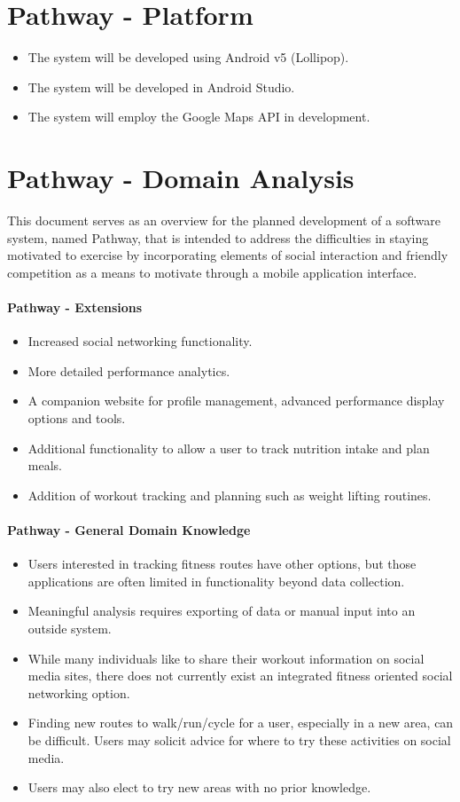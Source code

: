 ﻿\documentclass{article}
\begin{document}
\section{Pathway - Platform}
\begin{itemize}
    \item The system will be developed using Android v5 (Lollipop).
    \item The system will be developed in Android Studio.
    \item The system will employ the Google Maps API in development.
\end{itemize}

\section{Pathway - Domain Analysis}
This document serves as an overview for the planned development of a software system, named Pathway, that is intended to address the difficulties in staying motivated to exercise by incorporating elements of social interaction and friendly competition as a means to motivate through a mobile application interface.

\paragraph{Pathway - Extensions}
\begin{itemize}
    \item Increased social networking functionality.
    \item More detailed performance analytics.
    \item A companion website for profile management, advanced performance display options and tools.
    \item Additional functionality to allow a user to track nutrition intake and plan meals.
    \item Addition of workout tracking and planning such as weight lifting routines.
\end{itemize}

\paragraph{Pathway - General Domain Knowledge}
\begin{itemize}
    \item Users interested in tracking fitness routes have other options, but those applications are often limited in functionality beyond data collection.
    \item Meaningful analysis requires exporting of data or manual input into an outside system.
    \item While many individuals like to share their workout information on social media sites, there does not currently exist an integrated fitness oriented social networking option.
    \item Finding new routes to walk/run/cycle for a user, especially in a new area, can be difficult. Users may solicit advice for where to try these activities on social media.
    \item Users may also elect to try new areas with no prior knowledge.
\end{itemize}
\end{document}
